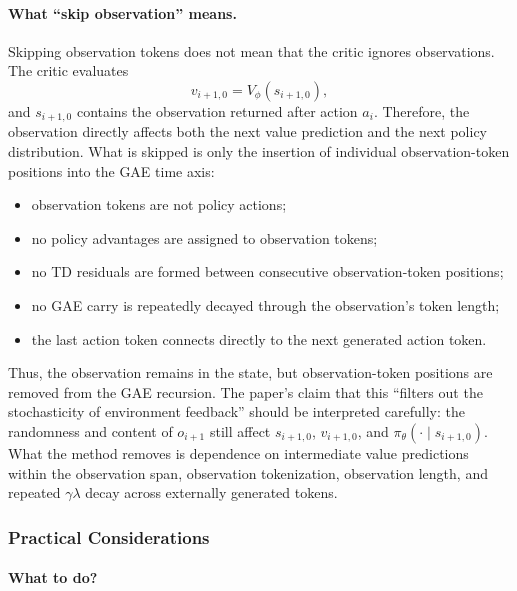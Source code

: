 \paragraph{What ``skip observation'' means.}
Skipping observation tokens does not mean that the critic ignores observations. The critic evaluates
\[
    v_{i+1,0}=V_\phi(s_{i+1,0}),
\]
and $s_{i+1,0}$ contains the observation returned after action $a_i$. Therefore, the observation directly affects both the next value prediction and the next policy distribution. What is skipped is only the insertion of individual observation-token positions into the GAE time axis:
\begin{itemize}
    \item observation tokens are not policy actions;
    \item no policy advantages are assigned to observation tokens;
    \item no TD residuals are formed between consecutive observation-token positions;
    \item no GAE carry is repeatedly decayed through the observation's token length;
    \item the last action token connects directly to the next generated action token.
\end{itemize}
Thus, the observation remains in the state, but observation-token positions are removed from the GAE recursion. The paper's claim that this ``filters out the stochasticity of environment feedback'' should be interpreted carefully: the randomness and content of $o_{i+1}$ still affect $s_{i+1,0}$, $v_{i+1,0}$, and $\pi_\theta(\cdot\mid s_{i+1,0})$. What the method removes is dependence on intermediate value predictions within the observation span, observation tokenization, observation length, and repeated $\gamma\lambda$ decay across externally generated tokens.

\subsubsection{Practical Considerations}

\paragraph{What to do?}

